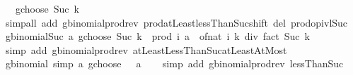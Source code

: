 \begin{isabellebody}
\ \ {\isachardoublequoteopen}{}\ gchoose\ {\isacharparenleft}{\kern0pt}Suc\ k{\isacharparenright}{\kern0pt}\ {\isacharequal}{\kern0pt}\ {}{\isachardoublequoteclose}\isanewline
%
\isadelimproof
\ \ %
\endisadelimproof
%
\isatagproof
{}\isamarkupfalse%
\ {\isacharparenleft}{\kern0pt}simp{\isacharunderscore}{\kern0pt}all\ add{\isacharcolon}{\kern0pt}\ gbinomial{\isacharunderscore}{\kern0pt}prod{\isacharunderscore}{\kern0pt}rev\ prod{\isachardot}{\kern0pt}atLeast{}{\isacharunderscore}{\kern0pt}lessThan{\isacharunderscore}{\kern0pt}Suc{\isacharunderscore}{\kern0pt}shift\ del{\isacharcolon}{\kern0pt}\ prod{\isachardot}{\kern0pt}op{\isacharunderscore}{\kern0pt}ivl{\isacharunderscore}{\kern0pt}Suc{\isacharparenright}{\kern0pt}%
\endisatagproof
{\isafoldproof}%
%
\isadelimproof
\isanewline
%
\endisadelimproof
\isanewline
{}\isamarkupfalse%
\ gbinomial{\isacharunderscore}{\kern0pt}Suc{\isacharcolon}{\kern0pt}\ {\isachardoublequoteopen}a\ gchoose\ {\isacharparenleft}{\kern0pt}Suc\ k{\isacharparenright}{\kern0pt}\ {\isacharequal}{\kern0pt}\ prod\ {\isacharparenleft}{\kern0pt}{\isasymlambda}i{\isachardot}{\kern0pt}\ a\ {\isacharminus}{\kern0pt}\ of{\isacharunderscore}{\kern0pt}nat\ i{\isacharparenright}{\kern0pt}\ {\isacharbraceleft}{\kern0pt}{}{\isachardot}{\kern0pt}{\isachardot}{\kern0pt}k{\isacharbraceright}{\kern0pt}\ div\ fact\ {\isacharparenleft}{\kern0pt}Suc\ k{\isacharparenright}{\kern0pt}{\isachardoublequoteclose}\isanewline
%
\isadelimproof
\ \ %
\endisadelimproof
%
\isatagproof
{}\isamarkupfalse%
\ {\isacharparenleft}{\kern0pt}simp\ add{\isacharcolon}{\kern0pt}\ gbinomial{\isacharunderscore}{\kern0pt}prod{\isacharunderscore}{\kern0pt}rev\ atLeastLessThanSuc{\isacharunderscore}{\kern0pt}atLeastAtMost{\isacharparenright}{\kern0pt}%
\endisatagproof
{\isafoldproof}%
%
\isadelimproof
\isanewline
%
\endisadelimproof
\isanewline
{}\isamarkupfalse%
\ gbinomial{\isacharunderscore}{\kern0pt}{}\ {\isacharbrackleft}{\kern0pt}simp{\isacharbrackright}{\kern0pt}{\isacharcolon}{\kern0pt}\ {\isachardoublequoteopen}a\ gchoose\ {}\ {\isacharequal}{\kern0pt}\ a{\isachardoublequoteclose}\isanewline
%
\isadelimproof
\ \ %
\endisadelimproof
%
\isatagproof
{}\isamarkupfalse%
\ {\isacharparenleft}{\kern0pt}simp\ add{\isacharcolon}{\kern0pt}\ gbinomial{\isacharunderscore}{\kern0pt}prod{\isacharunderscore}{\kern0pt}rev\ lessThan{\isacharunderscore}{\kern0pt}Suc{\isacharparenright}{\kern0pt}%
\endisatagproof
{\isafoldproof}%
%
\isadelimproof
\isanewline

\end{isabellebody}
